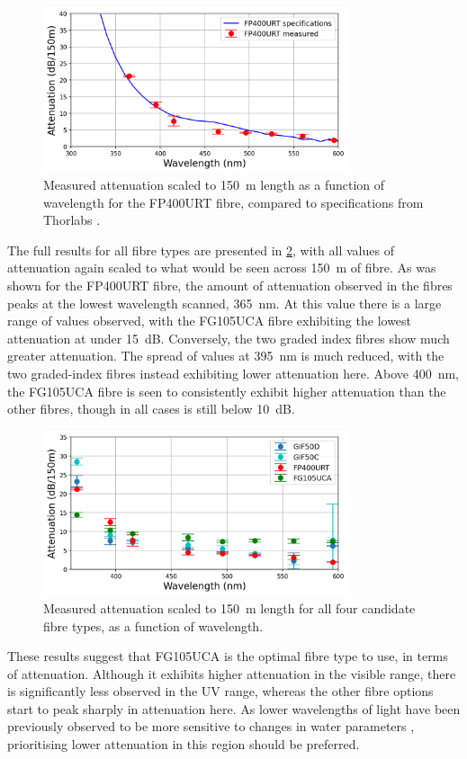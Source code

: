 \documentclass[a4paper,11pt]{article}
\begin{document}
\begin{figure}[h]
\centering
\includegraphics[width=0.8\textwidth]{FP400Compar.png}
\caption{Measured attenuation scaled to 150~m length as a function of wavelength for the FP400URT fibre, compared to specifications from Thorlabs \cite{bib:fp400urt}.}\label{fig:fp400compar}
\end{figure}

The full results for all fibre types are presented in \cref{fig:attenall}, with all values of attenuation again scaled to what would be seen across 150~m of fibre. As was shown for the FP400URT fibre, the amount of attenuation observed in the fibres peaks at the lowest wavelength scanned, 365~nm. At this value there is a large range of values observed, with the FG105UCA fibre exhibiting the lowest attenuation at under 15~dB. Conversely, the two graded index fibres show much greater attenuation. The spread of values at 395~nm is much reduced, with the two graded-index fibres instead exhibiting lower attenuation here. Above 400~nm, the FG105UCA fibre is seen to consistently exhibit higher attenuation than the other fibres, though in all cases is still below 10~dB.
\begin{figure}[h]
\centering
\includegraphics[width=0.8\textwidth]{AttenAll.png}
\caption{Measured attenuation scaled to 150~m length for all four candidate fibre types, as a function of wavelength.}\label{fig:attenall}
\end{figure}
These results suggest that FG105UCA is the optimal fibre type to use, in terms of attenuation. Although it exhibits higher attenuation in the visible range, there is significantly less observed in the UV range, whereas the other fibre options start to peak sharply in attenuation here. As lower wavelengths of light have been previously observed to be more sensitive to changes in water parameters \cite{bib:skgd2}, prioritising lower attenuation in this region should be preferred.
\end{document}
